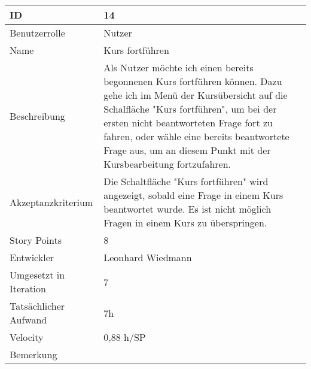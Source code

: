 \begin{tabularx}{\textwidth}{|p{}|X|}
	\hline
	ID & 14 \\
	\hline
	Benutzerrolle & Nutzer\\
	\hline
	Name & Kurs fortführen\\
	\hline
	Beschreibung & Als Nutzer möchte ich einen bereits begonnenen Kurs fortführen können. Dazu gehe ich im Menü der Kursübersicht auf die Schalfläche "Kurs fortführen", um bei der ersten nicht beantworteten Frage fort zu fahren, oder wähle eine bereits beantwortete Frage aus, um an diesem Punkt mit der Kursbearbeitung fortzufahren. \\
	\hline
	Akzeptanzkriterium & Die Schaltfläche "Kurs fortführen" wird angezeigt, sobald eine Frage in einem Kurs beantwortet wurde. Es ist nicht möglich Fragen in einem Kurs zu überspringen.\\
	\hline
	Story Points & 8\\
	\hline
	Entwickler & Leonhard Wiedmann\\
	\hline
	Umgesetzt in Iteration & 7 \\
	\hline
	Tatsächlicher Aufwand & 7h \\
	\hline
	Velocity & 0,88 h/SP \\
	\hline
	Bemerkung & \\
	\hline
\end{tabularx}
\vspace{20pt}
